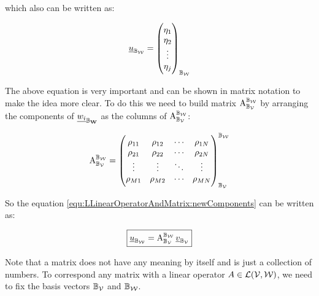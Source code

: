 which also can be written as:

\begin{equation*}
	\underline{u}_{\mathbb{B}_{\mathcal{W}}} = \begin{pmatrix}
		\eta_1 \\
		\eta_2 \\
		\vdots \\
		\eta_j
	\end{pmatrix}_{\mathbb{B}_{\mathcal{W}}}
\end{equation*}


The above equation is very important and can be shown in matrix notation to make the idea more clear. To do this we need to build matrix $ \operatorname{A}_{\mathbb{B}_{\mathcal{V}}}^{\mathbb{B}_{\mathcal{W}}} $ by arranging the components of $\underline{w_i}_{\mathbb{B}_{\mathbf{W}}}$ as the columns of $ \operatorname{A}_{\mathbb{B}_{\mathcal{V}}}^{\mathbb{B}_{\mathcal{W}}} $:

\begin{equation}
	\operatorname{A}_{\mathbb{B}_{\mathcal{V}}}^{\mathbb{B}_{\mathcal{W}}} = \begin{pmatrix}
		\rho_{11} & \rho_{12} & \cdots & \rho_{1N}\\
		\rho_{21} & \rho_{22} & \cdots & \rho_{2N}\\
		\vdots    & \vdots    & \ddots & \vdots\\
		\rho_{M1} & \rho_{M2} & \cdots & \rho_{MN} 
	\end{pmatrix}_{\mathbb{B}_{\mathcal{V}}}^{\mathbb{B}_{\mathcal{W}}}
\end{equation}

So the equation \ref{equ:LLinearOperatorAndMatrix:newComponents} can be written as:

\begin{LARGE}
	\begin{equation}
		\boxed{
		\underline{u}_{\mathbb{B}_{\mathcal{W}}} = \operatorname{A}_{\mathbb{B}_{\mathcal{V}}}^{\mathbb{B}_{\mathcal{W}}} \underline{v}_{\mathbb{B}_{\mathcal{V}}}
		}
	\end{equation}
	\label{equ:matrixAndLinearOperator_compact}
\end{LARGE}


Note that a matrix does not have any meaning by itself and is just a collection of numbers. To correspond any matrix with a linear operator $ A \in \mathcal{L}(\mathcal{V},\mathcal{W})$, we need to fix the basis vectors $ \mathbb{B}_{\mathcal{V}} $ and $ \mathbb{B}_{\mathcal{W}} $.






